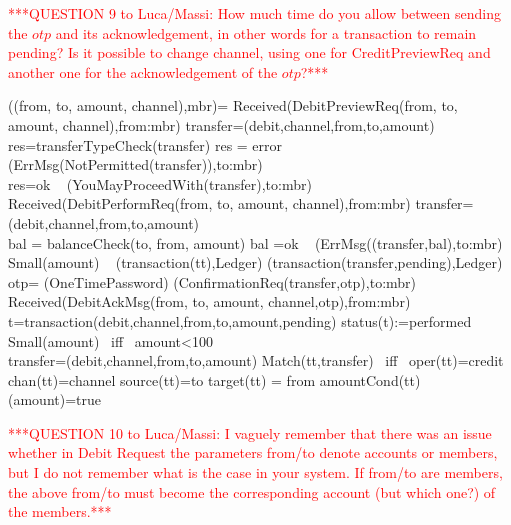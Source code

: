 \textcolor{red}{***QUESTION 9 to Luca/Massi: How much time do you allow between sending the $otp$ and its acknowledgement, in other words for a transaction to remain pending? Is it possible to change channel, using one for CreditPreviewReq and another one for the acknowledgement of the $otp$?***}
\vspace{12pt}

\begin{asm}
((from, to, amount, channel),mbr)=\+
\IF  Received(DebitPreviewReq(from, to, amount, channel),from:mbr) \THEN \+  
   \LET transfer=(debit,channel,from,to,amount)    \\
   \LET res=transferTypeCheck(transfer) \+
      \IF res = error \THEN ~ (ErrMsg(NotPermitted(transfer)),to:mbr)\\
      \IF res=ok \THEN ~ (YouMayProceedWith(transfer),to:mbr)\dec\-
\IF  Received(DebitPerformReq(from, to, amount, channel),from:mbr) \THEN \+     
  \LET transfer=(debit,channel,from,to,amount)  \\
  \LET bal = balanceCheck(to, from, amount) \+
      \IF bal \not =ok \THEN ~ (ErrMsg((transfer,bal),to:mbr)   \ELSE \+
         \IF Small(amount) \THEN ~ (transaction(tt),Ledger) \ELSE \+
            (transaction(transfer,pending),Ledger) \\        
            \LET otp= \NEW(OneTimePassword) \+
               (ConfirmationReq(transfer,otp),to:mbr)\dec\dec\dec\dec\-
\IF  Received(DebitAckMsg(from, to, amount, channel,otp),from:mbr) \THEN \+ 
     \LET t=transaction(debit,channel,from,to,amount,pending) \+
           status(t):=performed \dec\-       
\WHERE \+
Small(amount) \mbox{ iff } amount<100 \\
 \LET transfer=(debit,channel,from,to,amount) \+
     Match(tt,transfer) \mbox{ iff } oper(tt)=credit \AND chan(tt)=channel \AND \+
        source(tt)=to \AND target(tt) =  from \AND amountCond(tt)(amount)=true
\end{asm}

\vspace{12pt}
\textcolor{red}{***QUESTION 10 to Luca/Massi: I vaguely remember that there was an issue whether in Debit Request the parameters from/to denote accounts or members, but I do not remember what is the case in your system. If from/to are members, the above from/to must become the corresponding account (but which one?) of the members.***}
\vspace{12pt}

